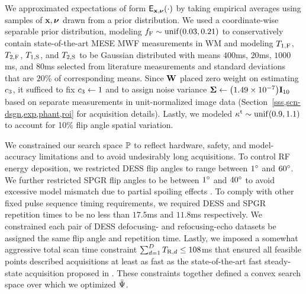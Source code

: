 We approximated expectations 
of form $\expect{\bmx,\bmnu}{\cdot}$
by taking empirical averages
using samples of $\mathbf{x},\boldsymbol{\nu}$ 
drawn from a prior distribution.
We used a coordinate-wise separable prior distribution,
modeling $\ff \sim \unif{0.03, 0.21}$
to conservatively contain
state-of-the-art MESE MWF measurements in WM
\cite{zhang:15:com}
and modeling $T_{1,\mathrm{F}}$, $T_{2,\mathrm{F}}$, $T_{1,\mathrm{S}}$, and $T_{2,\mathrm{S}}$
to be Gaussian distributed
with means $400$ms, $20$ms, $1000$ms, and $80$ms
selected from literature measurements 
\cite{mackay:94:ivv, deoni:11:com}
and standard deviations
that are $20$\% of corresponding means.
Since $\mathbf{W}$ placed zero weight 
on estimating $c_{3}$, 
it sufficed to fix $c_{3} \gets 1$
and to assign noise variance
$\bmSig \gets \paren{1.49 \times 10^{-7}}\eye{10}$
based on separate measurements
in unit-normalized image data
(\cf Section~\ref{sss,scn-dsgn,exp,phant,roi}
for acquisition details).
Lastly, 
we modeled $\stx \sim \unif{0.9,1.1}$ 
to account for 10\% flip angle spatial variation.

We constrained our search space $\mathbb{P}$
to reflect hardware, safety, and model-accuracy limitations
and to avoid undesirably long acquisitions.
To control RF energy deposition,
we restricted DESS flip angles 
to range between $1^{\circ}$ and $60^{\circ}$.
We further restricted SPGR flip angles
to be between $1^{\circ}$ and $40^{\circ}$
to avoid excessive model mismatch 
due to partial spoiling effects \cite{zur:91:sot}.
To comply with other fixed pulse sequence timing requirements,
we required DESS and SPGR repetition times
to be no less
than $17.5$ms and $11.8$ms respectively.
We constrained each pair
of DESS defocusing- and refocusing-echo datasets
be assigned the same flip angle and repetition time.
Lastly, 
we imposed a somewhat aggressive total scan time constraint 
$\sum_{d=1}^D T_{\mathrm{R},d} \leq 108$ms
that ensured all feasible points described acquisitions
at least as fast
as the state-of-the-art fast steady-state acquisition
proposed in \cite{deoni:11:com}.
These constraints together defined a convex search space
over which we optimized $\bar{\Psi}$.

